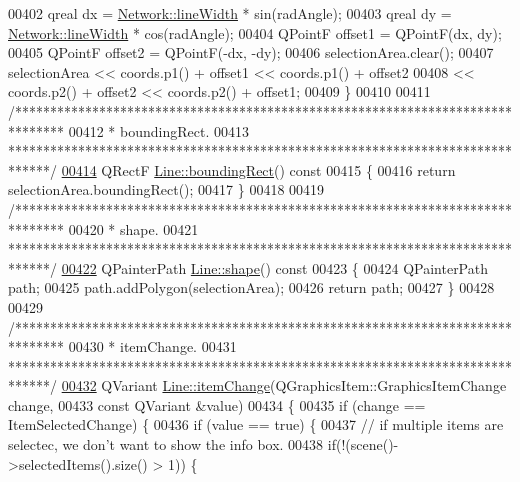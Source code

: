 \begin{DoxyCode}
00402   qreal dx = \hyperlink{group___graphics_ga3f810634c9908d62d33a1ab09a76c147}{Network::lineWidth} * sin(radAngle);
00403   qreal dy = \hyperlink{group___graphics_ga3f810634c9908d62d33a1ab09a76c147}{Network::lineWidth} * cos(radAngle);
00404   QPointF offset1 = QPointF(dx, dy);
00405   QPointF offset2 = QPointF(-dx, -dy);
00406   selectionArea.clear();
00407   selectionArea << coords.p1() + offset1 << coords.p1() + offset2
00408                 << coords.p2() + offset2 << coords.p2() + offset1;
00409 \}
00410 
00411 \textcolor{comment}{/*******************************************************************************}
00412 \textcolor{comment}{ * boundingRect.}
00413 \textcolor{comment}{ ******************************************************************************/}
\hypertarget{line_8cpp_source_l00414}{}\hyperlink{group___models_gad15c3af158d3b966c04be7e18cee5aea}{00414} QRectF \hyperlink{group___models_gad15c3af158d3b966c04be7e18cee5aea}{Line::boundingRect}()\textcolor{keyword}{ const}
00415 \textcolor{keyword}{}\{
00416   \textcolor{keywordflow}{return} selectionArea.boundingRect();
00417 \}
00418 
00419 \textcolor{comment}{/*******************************************************************************}
00420 \textcolor{comment}{ * shape.}
00421 \textcolor{comment}{ ******************************************************************************/}
\hypertarget{line_8cpp_source_l00422}{}\hyperlink{group___models_gaf1736b829a643d99052ef6428ddd5b16}{00422} QPainterPath \hyperlink{group___models_gaf1736b829a643d99052ef6428ddd5b16}{Line::shape}()\textcolor{keyword}{ const}
00423 \textcolor{keyword}{}\{
00424   QPainterPath path;
00425   path.addPolygon(selectionArea);
00426   \textcolor{keywordflow}{return} path;
00427 \}
00428 
00429 \textcolor{comment}{/*******************************************************************************}
00430 \textcolor{comment}{ * itemChange.}
00431 \textcolor{comment}{ ******************************************************************************/}
\hypertarget{line_8cpp_source_l00432}{}\hyperlink{group___models_ga5fcee3f23eb50e34f730d602a3802b93}{00432} QVariant \hyperlink{group___models_ga5fcee3f23eb50e34f730d602a3802b93}{Line::itemChange}(QGraphicsItem::GraphicsItemChange change,
00433                           \textcolor{keyword}{const} QVariant &value)
00434 \{
00435   \textcolor{keywordflow}{if} (change == ItemSelectedChange) \{
00436     \textcolor{keywordflow}{if} (value == \textcolor{keyword}{true}) \{
00437       \textcolor{comment}{// if multiple items are selectec, we don't want to show the info box.}
00438       \textcolor{keywordflow}{if}(!(scene()->selectedItems().size() > 1)) \{

\end{DoxyCode}
